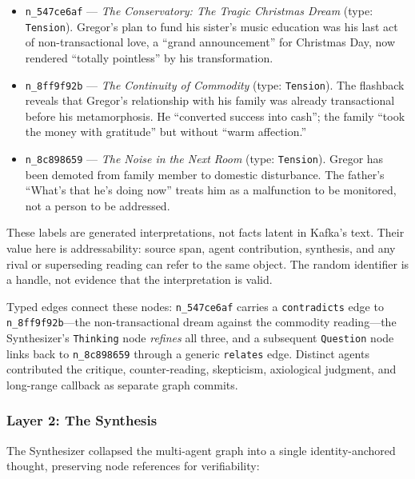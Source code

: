\begin{itemize}
    \item \texttt{n\_547ce6af} --- \emph{The Conservatory: The Tragic Christmas Dream} (type: \texttt{Tension}). Gregor's plan to fund his sister's music education was his last act of non-transactional love, a ``grand announcement'' for Christmas Day, now rendered ``totally pointless'' by his transformation.

    \item \texttt{n\_8ff9f92b} --- \emph{The Continuity of Commodity} (type: \texttt{Tension}). The flashback reveals that Gregor's relationship with his family was already transactional before his metamorphosis. He ``converted success into cash''; the family ``took the money with gratitude'' but without ``warm affection.''

    \item \texttt{n\_8c898659} --- \emph{The Noise in the Next Room} (type: \texttt{Tension}). Gregor has been demoted from family member to domestic disturbance. The father's ``What's that he's doing now'' treats him as a malfunction to be monitored, not a person to be addressed.
\end{itemize}

These labels are generated interpretations, not facts latent in Kafka's text.
Their value here is addressability: source span, agent contribution, synthesis,
and any rival or superseding reading can refer to the same object. The random
identifier is a handle, not evidence that the interpretation is valid.

Typed edges connect these nodes: \texttt{n\_547ce6af} carries a
\texttt{contradicts} edge to \texttt{n\_8ff9f92b}---the non-transactional dream
against the commodity reading---the Synthesizer's \texttt{Thinking} node
\emph{refines} all three, and a subsequent \texttt{Question} node links back to
\texttt{n\_8c898659} through a generic \texttt{relates} edge. Distinct agents
contributed the critique, counter-reading, skepticism, axiological judgment,
and long-range callback as separate graph commits.

\subsubsection{Layer 2: The Synthesis}

The Synthesizer collapsed the multi-agent graph into a single identity-anchored thought, preserving node references for verifiability:

